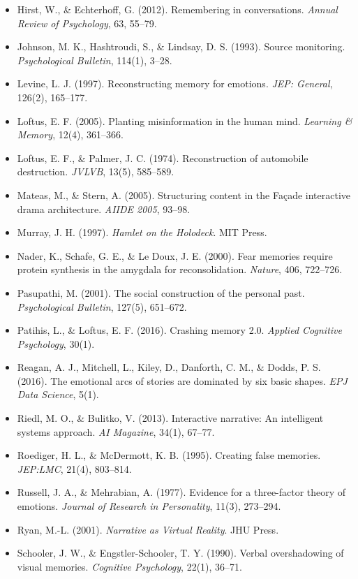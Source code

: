 \documentclass[11pt, a4paper]{article}
\begin{document}
\begin{itemize}
  \item Hirst, W., \& Echterhoff, G. (2012). Remembering in conversations. \textit{Annual Review of Psychology}, 63, 55--79.
  \item Johnson, M. K., Hashtroudi, S., \& Lindsay, D. S. (1993). Source monitoring. \textit{Psychological Bulletin}, 114(1), 3--28.
  \item Levine, L. J. (1997). Reconstructing memory for emotions. \textit{JEP: General}, 126(2), 165--177.
  \item Loftus, E. F. (2005). Planting misinformation in the human mind. \textit{Learning \& Memory}, 12(4), 361--366.
  \item Loftus, E. F., \& Palmer, J. C. (1974). Reconstruction of automobile destruction. \textit{JVLVB}, 13(5), 585--589.
  \item Mateas, M., \& Stern, A. (2005). Structuring content in the Façade interactive drama architecture. \textit{AIIDE 2005}, 93--98.
  \item Murray, J. H. (1997). \textit{Hamlet on the Holodeck}. MIT Press.
  \item Nader, K., Schafe, G. E., \& Le Doux, J. E. (2000). Fear memories require protein synthesis in the amygdala for reconsolidation. \textit{Nature}, 406, 722--726.
  \item Pasupathi, M. (2001). The social construction of the personal past. \textit{Psychological Bulletin}, 127(5), 651--672.
  \item Patihis, L., \& Loftus, E. F. (2016). Crashing memory 2.0. \textit{Applied Cognitive Psychology}, 30(1).
  \item Reagan, A. J., Mitchell, L., Kiley, D., Danforth, C. M., \& Dodds, P. S. (2016). The emotional arcs of stories are dominated by six basic shapes. \textit{EPJ Data Science}, 5(1).
  \item Riedl, M. O., \& Bulitko, V. (2013). Interactive narrative: An intelligent systems approach. \textit{AI Magazine}, 34(1), 67--77.
  \item Roediger, H. L., \& McDermott, K. B. (1995). Creating false memories. \textit{JEP:LMC}, 21(4), 803--814.
  \item Russell, J. A., \& Mehrabian, A. (1977). Evidence for a three-factor theory of emotions. \textit{Journal of Research in Personality}, 11(3), 273--294.
  \item Ryan, M.-L. (2001). \textit{Narrative as Virtual Reality}. JHU Press.
  \item Schooler, J. W., \& Engstler-Schooler, T. Y. (1990). Verbal overshadowing of visual memories. \textit{Cognitive Psychology}, 22(1), 36--71.

\end{itemize}
\end{document}
